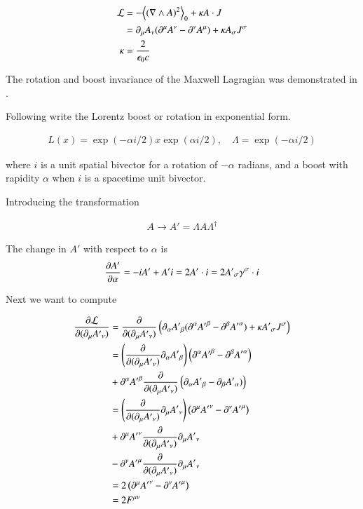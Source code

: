 \documentclass{article}
\begin{document}
\begin{align}\label{eqn:lagrangian}
\mathcal{L} 
&= -{\left\langle{{(\nabla\wedge A)^2}}\right\rangle}_{0} + \kappa A \cdot J \\
&= \partial_\mu A_\nu (\partial^\mu A^\nu - \partial^\nu A^\mu) + \kappa A_\sigma J^\sigma \\
\kappa &= \frac{2}{\epsilon_0 c}
\end{align}

The rotation and boost invariance of the Maxwell Lagragian was demonstrated in 
\cite{PJBoostMaxwell}.

Following 
\cite{PJLorentzTxInteraction}
write the Lorentz boost or rotation in exponential form.

\begin{align*}
L(x) = \exp(-\alpha i/2) x \exp(\alpha i/2), \quad \Lambda = \exp(-\alpha i/2)
\end{align*}

where $i$ is a unit spatial bivector for a rotation of $-\alpha$ radians, and a boost with rapidity $\alpha$ when $i$ is a spacetime unit bivector.

Introducing the transformation

\begin{align*}
A \rightarrow A' = \Lambda A \Lambda^\dagger
\end{align*}

The change in $A'$ with respect to $\alpha$ is
\begin{align*}
\frac{\partial {A'}}{\partial {\alpha}} = -i A' + A' i = 2 A' \cdot i = 2 {A'}_\sigma \gamma^\sigma \cdot i
\end{align*}

Next we want to compute

\begin{align*}
\frac{\partial {\mathcal{L}}}{\partial {(\partial_\mu {A'}_\nu)}} 
&= \frac{\partial {}}{\partial {(\partial_\mu {A'}_\nu)}} \left( \partial_\alpha {A'}_\beta (\partial^\alpha {A'}^\beta - \partial^\beta {A'}^\alpha) + \kappa {A'}_\sigma J^\sigma \right) \\
&= \left( \frac{\partial {}}{\partial {(\partial_\mu {A'}_\nu)}} \partial_\alpha {A'}_\beta \right) \left(\partial^\alpha {A'}^\beta - \partial^\beta {A'}^\alpha \right) \\
&+ \partial^\alpha {A'}^\beta \frac{\partial {}}{\partial {(\partial_\mu {A'}_\nu)}} \left(\partial_\alpha {A'}_\beta - \partial_\beta {A'}_\alpha) \right) \\
&= \left( \frac{\partial {}}{\partial {(\partial_\mu {A'}_\nu)}} \partial_\mu {A'}_\nu \right) \left(\partial^\mu {A'}^\nu - \partial^\nu {A'}^\mu \right) \\
&+ \partial^\mu {A'}^\nu \frac{\partial {}}{\partial {(\partial_\mu {A'}_\nu)}} \partial_\mu {A'}_\nu \\
&- \partial^\nu {A'}^\mu \frac{\partial {}}{\partial {(\partial_\mu {A'}_\nu)}} \partial_\mu {A'}_\nu \\
&= 2 \left( \partial^\mu {A'}^\nu - \partial^\nu {A'}^\mu \right) \\
&= 2 F^{\mu\nu}
\end{align*}
\end{document}
